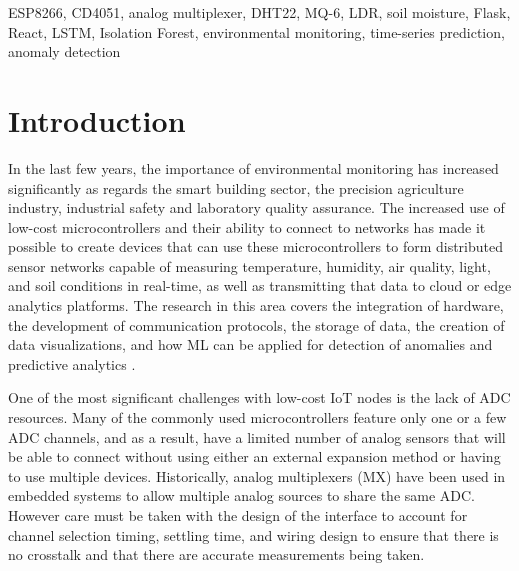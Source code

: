 \documentclass[journal,onecolumn]{IEEEtran}
\begin{document}
\begin{IEEEkeywords}
ESP8266, CD4051, analog multiplexer, DHT22, MQ-6, LDR, soil moisture, Flask, React, LSTM, Isolation Forest, environmental monitoring, time-series prediction, anomaly detection
\end{IEEEkeywords}

\section{Introduction}
In the last few years, the importance of environmental monitoring has increased significantly as regards the smart building sector, the precision agriculture industry, industrial safety and laboratory quality assurance. The increased use of low-cost microcontrollers and their ability to connect to networks has made it possible to create devices that can use these microcontrollers to form distributed sensor networks capable of measuring temperature, humidity, air quality, light, and soil conditions in real-time, as well as transmitting that data to cloud or edge analytics platforms. The research in this area covers the integration of hardware, the development of communication protocols, the storage of data, the creation of data visualizations, and how ML can be applied for detection of anomalies and predictive analytics \cite{sensorcloud2019,mlanomaly2022}.

One of the most significant challenges with low-cost IoT nodes \cite{iotgas2023,esp8266data2022} is the lack of ADC resources. Many of the commonly used microcontrollers feature only one or a few ADC channels, and as a result, have a limited number of analog sensors that will be able to connect without using either an external expansion method or having to use multiple devices. Historically, analog multiplexers (MX) have been used in embedded systems to allow multiple analog sources to share the same ADC. However care must be taken with the design of the interface to account for channel selection timing, settling time, and wiring design to ensure that there is no crosstalk and that there are accurate measurements being taken.
\end{document}
